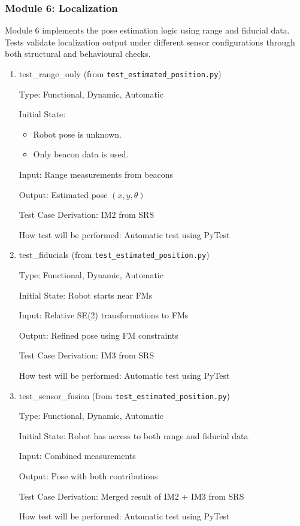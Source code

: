 \documentclass[12pt, titlepage]{article}
\begin{document}
\subsubsection{Module 6: Localization}

Module 6 implements the pose estimation logic using range and fiducial data. Tests validate localization output under different sensor configurations through both structural and behavioural checks.

\begin{enumerate}
  \item{test\_range\_only (from \texttt{test\_estimated\_position.py})}

  Type: Functional, Dynamic, Automatic
            
  Initial State:  
  \begin{itemize}
    \item Robot pose is unknown.
    \item Only beacon data is used.
  \end{itemize}
            
  Input: Range measurements from beacons
            
  Output: Estimated pose $(x, y, \theta)$
  
  Test Case Derivation: IM2 from SRS
  
  How test will be performed: Automatic test using PyTest
            
  \item{test\_fiducials (from \texttt{test\_estimated\_position.py})}
  
  Type: Functional, Dynamic, Automatic
            
  Initial State: Robot starts near FMs
            
  Input: Relative SE(2) transformations to FMs
            
  Output: Refined pose using FM constraints
  
  Test Case Derivation: IM3 from SRS
  
  How test will be performed: Automatic test using PyTest
  
  \item{test\_sensor\_fusion (from \texttt{test\_estimated\_position.py})}
  
  Type: Functional, Dynamic, Automatic
            
  Initial State: Robot has access to both range and fiducial data
            
  Input: Combined measurements
            
  Output: Pose with both contributions
  
  Test Case Derivation: Merged result of IM2 + IM3 from SRS
  
  How test will be performed: Automatic test using PyTest
\end{enumerate}
\end{document}
